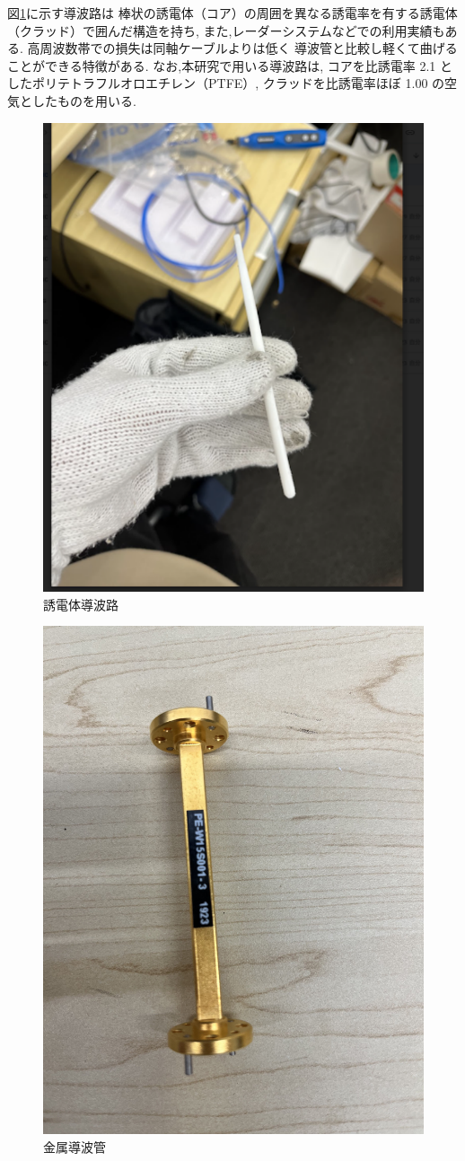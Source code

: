 \documentclass[technicalreport]{ieicej}
\begin{document}
図\ref{fig:dielectric_waveguide}に示す導波路は
棒状の誘電体（コア）の周囲を異なる誘電率を有する誘電体（クラッド）で囲んだ構造を持ち,
また,レーダーシステム\cite{4297420}などでの利用実績もある.
高周波数帯での損失は同軸ケーブルよりは低く
導波管と比較し軽くて曲げることができる特徴がある.
なお,本研究で用いる導波路は,
コアを比誘電率 2.1 としたポリテトラフルオロエチレン（PTFE）,
クラッドを比誘電率ほぼ 1.00 の空気としたものを用いる.

\begin{figure}[tb]
  \begin{center}
    \includegraphics[bb=0 0 311 384, width=0.5\linewidth]{img/waveguide.pdf}
    \caption{誘電体導波路}
    \label{fig:dielectric_waveguide}
  \end{center}
\end{figure}

\begin{figure}[tb]
  \begin{center}
    \includegraphics[bb=0.000000 0.000000 593.264305 791.019074, width=0.5\linewidth]{img/metallic_waveguide.pdf}
    \caption{金属導波管}
    \label{fig:metallic_waveguide}
  \end{center}
\end{figure}
\end{document}
